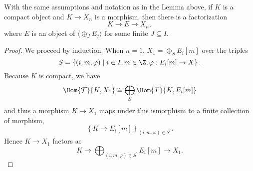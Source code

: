 \documentclass[10pt]{amsart}
\begin{document}
\begin{lem}
  With the same assumptions and notation as in the Lemma above, if $K$ is a compact object and $K \rightarrow X_n$ is a morphism, then there is a factorization 
  $$K \rightarrow E \rightarrow X_n,$$
  where $E$ is an object of $\langle \oplus_{J}E_j \rangle$ for some finite $J \subseteq I$.
  \begin{proof}
    We proceed by induction.
    When $n = 1$, $X_1 = \oplus_S E_i[m]$ over the triples
    $$S = \left\{(i,m,\varphi) \;\middle\vert\; i \in I, m \in \Z, \varphi : E_i[m] \rightarrow X\right\}.$$
    Because $K$ is compact, we have
    $$\Hom{\T}{K,X_1} \cong \bigoplus_S\Hom{T}{K, E_i[m]}$$
    and thus a morphism $K \rightarrow X_1$ maps under this ismorphism to a finite collection of morphism, $$\left\{K \rightarrow E_i[m]\right\}_{(i,m,\varphi) \in S^\prime}.$$
    Hence $K \rightarrow X_1$ factors as
    $$K \rightarrow \bigoplus_{(i,m,\varphi) \in S^\prime}E_i[m] \rightarrow X_1.$$


\end{proof}
\end{lem}
\end{document}
